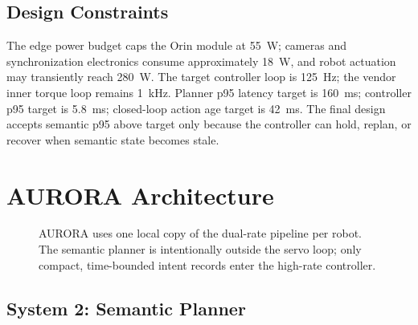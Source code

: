 \documentclass[10pt,twocolumn]{article}
\begin{document}
\subsection{Design Constraints}

The edge power budget caps the Orin module at \SI{55}{W}; cameras and synchronization electronics consume approximately \SI{18}{W}, and robot actuation may transiently reach \SI{280}{W}. The target controller loop is \SI{125}{Hz}; the vendor inner torque loop remains \SI{1}{kHz}. Planner p95 latency target is \SI{160}{ms}; controller p95 target is \SI{5.8}{ms}; closed-loop action age target is \SI{42}{ms}. The final design accepts semantic p95 above target only because the controller can hold, replan, or recover when semantic state becomes stale.

\section{AURORA Architecture}

\begin{figure}[t]
\centering
{}
\caption{AURORA uses one local copy of the dual-rate pipeline per robot. The semantic planner is intentionally outside the servo loop; only compact, time-bounded intent records enter the high-rate controller.}
\label{fig:architecture}
\end{figure}

\subsection{System 2: Semantic Planner}
\end{document}
